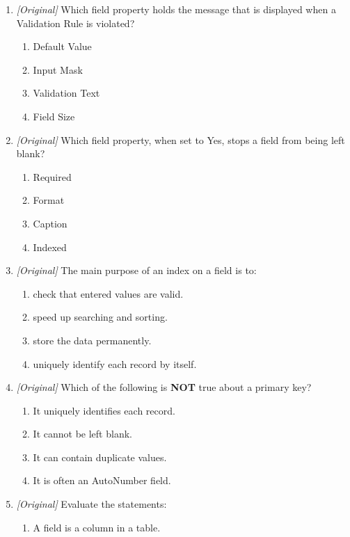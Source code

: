 \documentclass[11pt]{article}
\begin{document}
\begin{enumerate}[label=\textbf{Q\arabic*.}, leftmargin=*]
\begin{enumerate}[label=\Alph*.]
    \item each record gets a unique number.
  \end{enumerate}
\item \textit{[Original]} Which field property holds the message that is
  displayed when a Validation Rule is violated?
  \begin{enumerate}[label=\Alph*.]
    \item Default Value
    \item Input Mask
    \item Validation Text
    \item Field Size
  \end{enumerate}
\item \textit{[Original]} Which field property, when set to Yes, stops a field
  from being left blank?
  \begin{enumerate}[label=\Alph*.]
    \item Required
    \item Format
    \item Caption
    \item Indexed
  \end{enumerate}
\item \textit{[Original]} The main purpose of an index on a field is to:
  \begin{enumerate}[label=\Alph*.]
    \item check that entered values are valid.
    \item speed up searching and sorting.
    \item store the data permanently.
    \item uniquely identify each record by itself.
  \end{enumerate}
\item \textit{[Original]} Which of the following is \textbf{NOT} true about a
  primary key?
  \begin{enumerate}[label=\Alph*.]
    \item It uniquely identifies each record.
    \item It cannot be left blank.
    \item It can contain duplicate values.
    \item It is often an AutoNumber field.
  \end{enumerate}
\item \textit{[Original]} Evaluate the statements:
  \begin{enumerate}[label=\Roman*.]
    \item A field is a column in a table.

\end{enumerate}
\end{enumerate}
\end{document}
